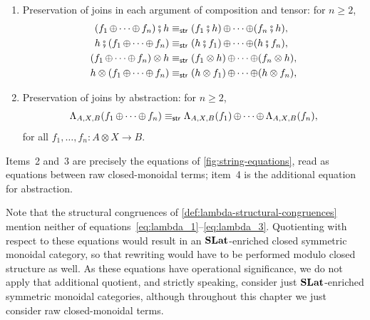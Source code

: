 \begin{definition}
\begin{enumerate}
  \item Preservation of joins in each argument of
  composition and tensor: for $n\geq2$,
  \begin{align*}
    (f_1 \operatorname{\oplus} \cdots \operatorname{\oplus} f_n) \fatsemi h
      &\equiv_{\mathsf{str}}
      (f_1 \fatsemi h) \operatorname{\oplus} \cdots \operatorname{\oplus} (f_n \fatsemi h),\\
    h \fatsemi (f_1 \operatorname{\oplus} \cdots \operatorname{\oplus} f_n)
      &\equiv_{\mathsf{str}}
      (h \fatsemi f_1) \operatorname{\oplus} \cdots \operatorname{\oplus} (h \fatsemi f_n),\\
    (f_1 \operatorname{\oplus} \cdots \operatorname{\oplus} f_n) \otimes h
      &\equiv_{\mathsf{str}}
      (f_1 \otimes h) \operatorname{\oplus} \cdots \operatorname{\oplus} (f_n \otimes h),\\
    h \otimes (f_1 \operatorname{\oplus} \cdots \operatorname{\oplus} f_n)
      &\equiv_{\mathsf{str}}
      (h \otimes f_1) \operatorname{\oplus} \cdots \operatorname{\oplus} (h \otimes f_n),
  \end{align*}
  \item Preservation of joins by abstraction: for $n\geq2$,
  \begin{equation}
    \Lambda_{A,X,B}(f_1 \operatorname{\oplus} \cdots \operatorname{\oplus} f_n)
    \equiv_{\mathsf{str}}
    \Lambda_{A,X,B}(f_1) \operatorname{\oplus} \cdots \operatorname{\oplus} \Lambda_{A,X,B}(f_n),
    \label{eq:lambda-join-structural}
  \end{equation}
  for all $f_1,\ldots,f_n : A \otimes X \to B$.
\end{enumerate}
Items~2 and~3 are precisely the equations of \cref{fig:string-equations},
read as equations between raw closed-monoidal terms; item~4 is the additional equation
for abstraction.
\end{definition}

Note that the structural congruences of \cref{def:lambda-structural-congruences} mention neither of equations~\eqref{eq:lambda_1}--\eqref{eq:lambda_3}.
Quotienting with respect to these equations would result in an $\mathbf{SLat}$-enriched closed symmetric monoidal category, so that rewriting would have to be performed modulo closed structure as well.
As these equations have operational significance, we do not apply that additional quotient, and strictly speaking, consider just $\mathbf{SLat}$-enriched symmetric monoidal categories, although throughout this chapter we just consider raw closed-monoidal terms.

